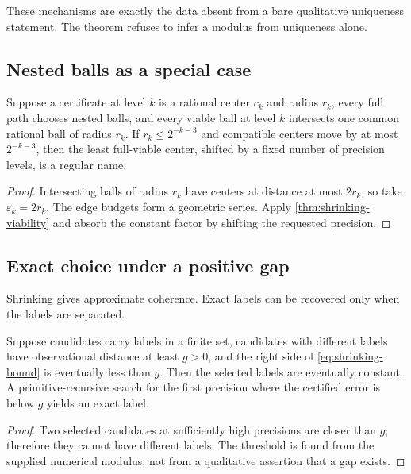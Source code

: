 These mechanisms are exactly the data absent from a bare qualitative
uniqueness statement.  The theorem refuses to infer a modulus from uniqueness
alone.

\subsection{Nested balls as a special case}

\begin{corollary}
\label{cor:nested-ball-name}
Suppose a certificate at level \(k\) is a rational center \(c_k\) and radius
\(r_k\), every full path chooses nested balls, and every viable ball at level
\(k\) intersects one common rational ball of radius \(r_k\).  If
\(r_k\le 2^{-k-3}\) and compatible centers move by at most
\(2^{-k-3}\), then the least full-viable center, shifted by a fixed number of
precision levels, is a regular name.
\end{corollary}

\begin{proof}
Intersecting balls of radius \(r_k\) have centers at distance at most
\(2r_k\), so take \(\varepsilon_k=2r_k\).  The edge budgets form a geometric
series.  Apply \cref{thm:shrinking-viability} and absorb the constant factor by
shifting the requested precision.
\end{proof}

\subsection{Exact choice under a positive gap}

Shrinking gives approximate coherence.  Exact labels can be recovered only
when the labels are separated.

\begin{corollary}
\label{cor:exact-label-gap}
Suppose candidates carry labels in a finite set, candidates with different
labels have observational distance at least \(g>0\), and the right side of
\eqref{eq:shrinking-bound} is eventually less than \(g\).  Then the selected
labels are eventually constant.  A primitive-recursive search for the first
precision where the certified error is below \(g\) yields an exact label.
\end{corollary}

\begin{proof}
Two selected candidates at sufficiently high precisions are closer than
\(g\); therefore they cannot have different labels.  The threshold is found
from the supplied numerical modulus, not from a qualitative assertion that a
gap exists.
\end{proof}

